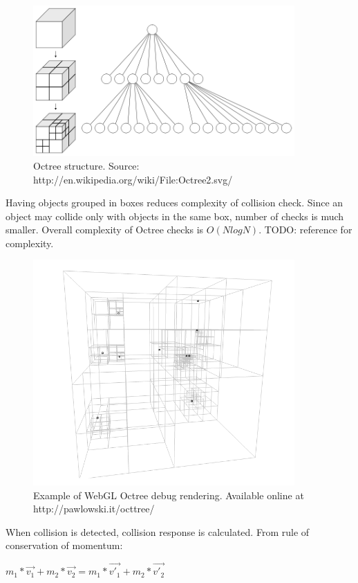 \begin{figure}[h!]
  \caption{Octree structure. Source: http://en.wikipedia.org/wiki/File:Octree2.svg/}
  \label{img:octree2}
  \centering
	\includegraphics[width=10cm]{octree/octree2.png}
\end{figure} 

Having objects grouped in boxes reduces complexity of collision check. Since an object may collide only with objects in the same box, number of checks is much smaller. Overall complexity of Octree checks is $O(N log{N})$.
TODO: reference for complexity.

\begin{figure}[h!]
  \caption{Example of WebGL Octree debug rendering. Available online at http://pawlowski.it/octtree/}
  \label{img:octree}
  \centering
	\includegraphics[width=10cm]{octree/octree.png}
\end{figure} 

When collision is detected, collision response is calculated. From rule of conservation of momentum:

\begin{center}
$m_1 * \vec{v_1} + m_2 * \vec{v_2} = m_1 * \vec{v'_1} + m_2 * \vec{v'_2}$
\end{center}

